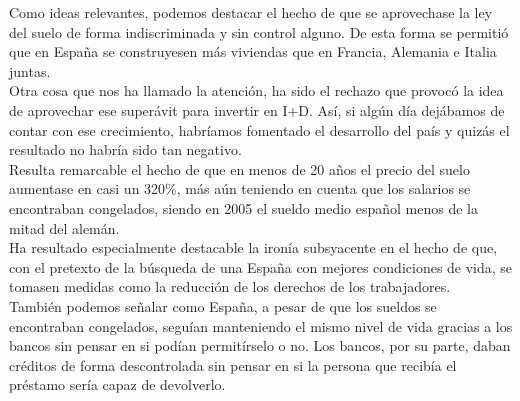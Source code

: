 \documentclass[11pt]{article}
\theoremstyle{plain}
\theoremstyle{definition}
\begin{document}
Como ideas relevantes, podemos destacar el hecho de que se aprovechase 
la ley del suelo de forma indiscriminada y sin control alguno. De esta 
forma se permitió que en España se construyesen más viviendas que en 
Francia, Alemania e Italia juntas.\\

Otra cosa que nos ha llamado la atención, ha sido el rechazo que provocó 
la idea de aprovechar ese superávit para invertir en I+D. Así, si algún día
dejábamos de contar con ese crecimiento, habríamos fomentado el desarrollo
del país y quizás el resultado no habría sido tan negativo.\\

Resulta remarcable el hecho de que en menos de 20 años el precio del suelo
aumentase en casi un 320\%, más aún teniendo en cuenta que los salarios se
encontraban congelados, siendo en 2005 el sueldo medio español menos de la
mitad del alemán.\\

Ha resultado especialmente destacable la ironía subsyacente en el hecho de 
que, con el pretexto de la búsqueda de una España con mejores condiciones de 
vida, se tomasen medidas como la reducción de los derechos de los trabajadores.\\

También podemos señalar como España, a pesar de que los sueldos se encontraban
congelados, seguían manteniendo el mismo nivel de vida gracias a los bancos
sin pensar en si podían permitírselo o no. Los bancos, por su parte, daban créditos
de forma descontrolada sin pensar en si la persona que recibía el préstamo sería
capaz de devolverlo.\\
\end{document}

